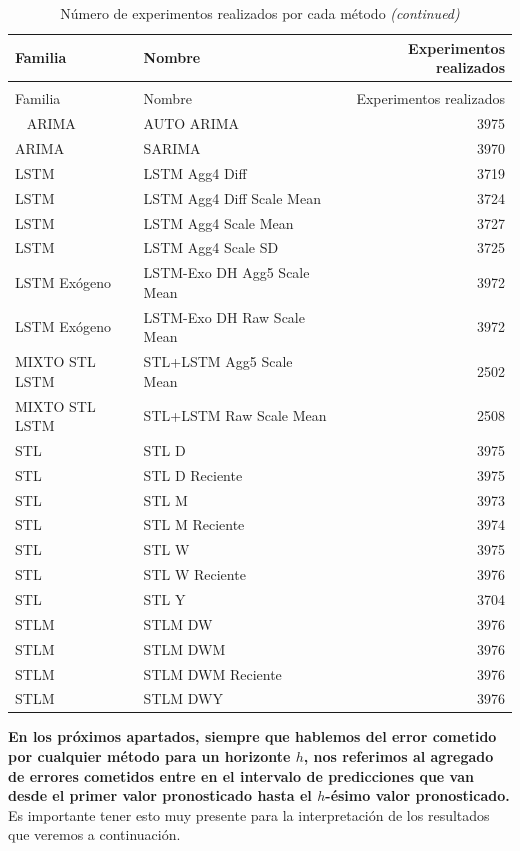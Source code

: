 \documentclass[]{book}
\begin{document}
\begin{longtable}{llr}
\caption{\label{tab:exps-by-method-tab}Número de experimentos realizados por cada método}\\
\toprule
Familia & Nombre & Experimentos realizados\\
\midrule
\endfirsthead
\caption[]{\label{tab:exps-by-method-tab}Número de experimentos realizados por cada método \textit{(continued)}}\\
\toprule
Familia & Nombre & Experimentos realizados\\
\midrule
\endhead
\
\endfoot
\bottomrule
\endlastfoot
\rowcolor{gray!6}  ARIMA & AUTO ARIMA & 3975\\
ARIMA & SARIMA & 3970\\
\rowcolor{gray!6}  LSTM & LSTM Agg4 Diff & 3719\\
LSTM & LSTM Agg4 Diff Scale Mean & 3724\\
\rowcolor{gray!6}  LSTM & LSTM Agg4 Scale Mean & 3727\\
\addlinespace
LSTM & LSTM Agg4 Scale SD & 3725\\
\rowcolor{gray!6}  LSTM Exógeno & LSTM-Exo DH Agg5 Scale Mean & 3972\\
LSTM Exógeno & LSTM-Exo DH Raw Scale Mean & 3972\\
\rowcolor{gray!6}  MIXTO STL LSTM & STL+LSTM Agg5 Scale Mean & 2502\\
MIXTO STL LSTM & STL+LSTM Raw Scale Mean & 2508\\
\addlinespace
\rowcolor{gray!6}  STL & STL D & 3975\\
STL & STL D Reciente & 3975\\
\rowcolor{gray!6}  STL & STL M & 3973\\
STL & STL M Reciente & 3974\\
\rowcolor{gray!6}  STL & STL W & 3975\\
\addlinespace
STL & STL W Reciente & 3976\\
\rowcolor{gray!6}  STL & STL Y & 3704\\
STLM & STLM DW & 3976\\
\rowcolor{gray!6}  STLM & STLM DWM & 3976\\
STLM & STLM DWM Reciente & 3976\\
\addlinespace
\rowcolor{gray!6}  STLM & STLM DWY & 3976\\*
\end{longtable}

\textbf{En los próximos apartados, siempre que hablemos del error
cometido por cualquier método para un horizonte \(h\), nos referimos al
agregado de errores cometidos entre en el intervalo de predicciones que
van desde el primer valor pronosticado hasta el \(h\)-ésimo valor
pronosticado.} Es importante tener esto muy presente para la
interpretación de los resultados que veremos a continuación.
\end{document}
